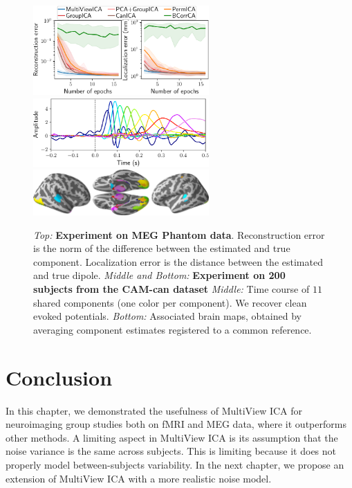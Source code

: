 \begin{figure}
    \centering

          \includegraphics[width=0.6\textwidth]{figures/mvica/phantom_new.pdf}
          \includegraphics[width=0.6\textwidth]{figures/mvica/camcan_sources.pdf}
          \includegraphics[width=0.6\textwidth]{figures/mvica/montage_all.png}
    \caption{\emph{Top:} \textbf{Experiment on MEG Phantom data}. Reconstruction
      error is the norm of the difference between the estimated and true
      component. Localization error is the distance between the estimated and
      true dipole. \emph{Middle and Bottom:} \textbf{Experiment on 200 subjects from the CAM-can dataset} \emph{Middle:} Time course of $11$ shared components (one color per component). We recover clean evoked potentials. \emph{Bottom:} Associated brain maps, obtained by averaging component estimates registered to a common reference.}
    \label{fig:meg}
\end{figure}

%
%


\section{Conclusion}
In this chapter, we demonstrated the usefulness of MultiView ICA for neuroimaging group studies both on fMRI and MEG data, where it outperforms other methods.
%
A limiting aspect in MultiView ICA is its assumption that the noise
variance is the same across subjects. This is limiting because it does not
properly model between-subjects variability.
%
In the next chapter, we propose an extension of MultiView ICA with a more realistic
noise model.

